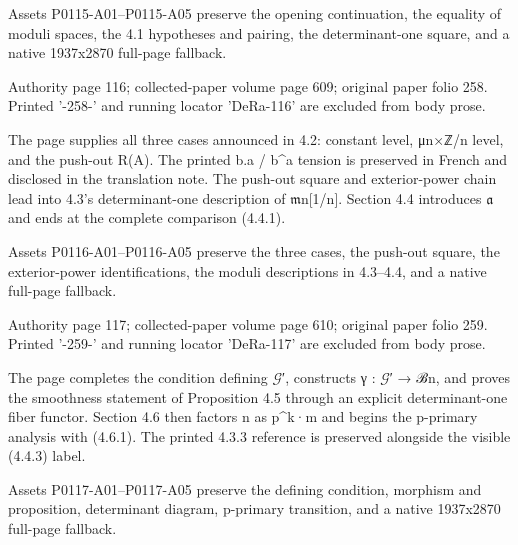 \documentclass[11pt,a4paper]{article}
\begin{document}
Assets P0115-A01--P0115-A05 preserve the opening continuation, the equality of moduli spaces, the 4.1 hypotheses and pairing, the determinant-one square, and a native 1937x2870 full-page fallback.


\par\medskip
\hypertarget{D018-P0116}{}
\par\smallskip
Authority page 116; collected-paper volume page 609; original paper folio 258. Printed '-258-' and running locator 'DeRa-116' are excluded from body prose.

The page supplies all three cases announced in 4.2: constant level, μ\textunderscore{}n×ℤ/n level, and the push-out R(A). The printed b.a / b\textasciicircum{}a tension is preserved in French and disclosed in the translation note. The push-out square and exterior-power chain lead into 4.3's determinant-one description of \ensuremath{\mathfrak{m}}\textunderscore{}n[1/n]. Section 4.4 introduces \ensuremath{\mathfrak{a}} and ends at the complete comparison (4.4.1).

Assets P0116-A01--P0116-A05 preserve the three cases, the push-out square, the exterior-power identifications, the moduli descriptions in 4.3--4.4, and a native full-page fallback.


\par\medskip
\hypertarget{D018-P0117}{}
\par\smallskip
Authority page 117; collected-paper volume page 610; original paper folio 259. Printed '-259-' and running locator 'DeRa-117' are excluded from body prose.

The page completes the condition defining \ensuremath{\mathcal{G}}′, constructs γ : \ensuremath{\mathcal{G}}′ → ℬ\textunderscore{}n, and proves the smoothness statement of Proposition 4.5 through an explicit determinant-one fiber functor. Section 4.6 then factors n as p\textasciicircum{}k·m and begins the p-primary analysis with (4.6.1). The printed 4.3.3 reference is preserved alongside the visible (4.4.3) label.

Assets P0117-A01--P0117-A05 preserve the defining condition, morphism and proposition, determinant diagram, p-primary transition, and a native 1937x2870 full-page fallback.
\end{document}
